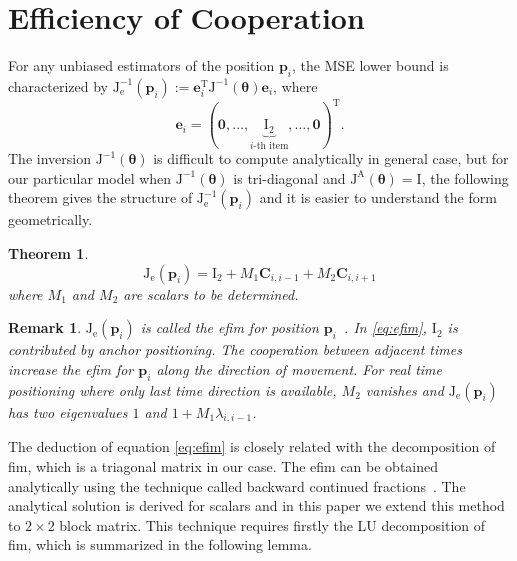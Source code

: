 \documentclass[conference]{IEEEtran}
\newtheorem{theorem}{Theorem}
\newtheorem{remark}{Remark}
\begin{document}
\section{Efficiency of Cooperation}\label{efficiency}
For any unbiased estimators of the position $\bm{p}_i$, the MSE lower bound is characterized by $\bm{\mathrm{J}}^{-1}_{\mathrm{e}}(\bm{p}_i):=\bm{e}_i^{\textrm{T}}\bm{\mathrm{J}}^{-1}(\bm{\theta})\bm{e}_i$, where
\begin{equation}
\bm{e}_i=(\bm{0},\dots,\underbrace{\bm{\mathrm{I}}_2}_{\text{$i$-th item}},\dots,\bm{0})^{\textrm{T}}.
\end{equation}
The inversion $\bm{\mathrm{J}}^{-1}(\bm{\theta})$ is difficult to compute analytically in general case, but for our particular model when $\bm{\mathrm{J}}^{-1}(\bm{\theta})$ is tri-diagonal and $\bm{\mathrm{J}}^\mathrm{A}(\bm{\theta})= \bm{\mathrm{I}}$, the following theorem gives the structure of $\bm{\mathrm{J}}^{-1}_{\mathrm{e}}(\bm{p}_i)$ and it is easier to understand the form geometrically.
\begin{theorem}
\begin{equation}\label{eq:efim}
\bm{\mathrm{J}}_{\mathrm{e}}(\bm{p}_i)=\bm{\mathrm{I}}_2+M_1 \bm{C}_{i,i-1} +M_2 \bm{C}_{i,i+1}
\end{equation}
where $M_1$ and $M_2$ are scalars to be determined.
\end{theorem}
\begin{remark}
$\bm{\mathrm{J}}_{\mathrm{e}}(\bm{p}_i)$ is called the \ac{efim} for position $\bm{p}_i$~\cite{LimitBound2}.
In \eqref{eq:efim}, $\bm{\mathrm{I}}_2$ is contributed by anchor positioning. 
The cooperation between adjacent times increase the \ac{efim} for $\bm{p}_i$ along the direction of movement. For real time positioning where only last time direction is available, $M_2$ vanishes and $\bm{\mathrm{J}}_{\mathrm{e}}(\bm{p}_i)$ 
has two eigenvalues $1$ and $1+M_1\lambda_{i,i-1}$.
\end{remark}
The deduction of equation \eqref{eq:efim} is closely related with the decomposition of \ac{fim}, which is a triagonal matrix in our case. 
The \ac{efim} can be obtained analytically using the technique called backward continued fractions~\cite{K2008Explicit}. 
The analytical solution is derived for scalars and in this paper we extend this method to $2\times 2$ block matrix. 
This technique requires firstly the LU decomposition of \ac{fim}, which is summarized in the following lemma.
\end{document}
